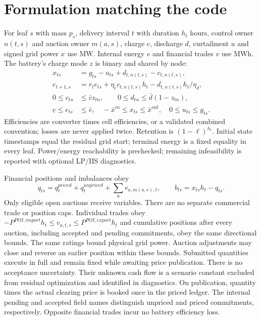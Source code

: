\documentclass[11pt,a4paper]{article}
\begin{document}
\section{Formulation matching the code}
For leaf $s$ with mass $p_s$, delivery interval $t$ with duration $h_t$ hours,
control owner $n(t,s)$ and auction owner $m(a,s)$, charge $c$, discharge $d$,
curtailment $u$ and signed grid power $x$ use MW. Internal energy $e$ and financial
trades $v$ use MWh. The battery's charge mode $z$ is binary and shared by node:
\begin{align}
x_{ts}&=g_{ts}-u_{ts}+d_{t,n(t,s)}-c_{t,n(t,s)},\\
e_{t+1,s}&=r_t e_{ts}+\eta_c c_{t,n(t,s)}h_t-d_{t,n(t,s)}h_t/\eta_d,\\
0\le c_{tn}&\le\bar c z_{tn},\qquad 0\le d_{tn}\le\bar d(1-z_{tn}),\\
\underline e\le e_{ts}&\le\bar e,\quad -\bar x^{in}\le x_{ts}\le\bar x^{out},\quad 0\le u_{ts}\le g_{ts}.
\end{align}
Efficiencies are converter times cell efficiencies, or a validated combined
convention; losses are never applied twice. Retention is $(1-\ell)^{h_t}$.
Initial state timestamps equal the residual grid start; terminal energy is a
fixed equality in every leaf. Power/energy reachability is prechecked; remaining
infeasibility is reported with optional LP/IIS diagnostics.

Financial positions and imbalances obey
\begin{equation}
q_{ts}=q^{priced}_t+q^{unpriced}_t+\sum_a v_{a,m(a,s),t},\qquad
b_{ts}=x_{ts}h_t-q_{ts}.
\end{equation}
Only eligible open auctions receive variables. There are no separate commercial
trade or position caps. Individual trades obey
$-P^{POI,import}h_t\le v_{a,t,s}\le P^{POI,export}h_t$ and cumulative positions
after every auction, including accepted and pending commitments, obey the same
directional bounds. The same ratings bound physical grid power. Auction
adjustments may close and reverse an earlier position within these bounds. Submitted quantities execute in full and remain
fixed while awaiting price publication. There is no acceptance uncertainty.
Their unknown cash flow is a scenario constant excluded from residual optimization
and identified in diagnostics. On publication, quantity times the actual clearing
price is booked once in the priced ledger. The internal pending and accepted field
names distinguish unpriced and priced commitments, respectively. Opposite financial trades incur no battery
efficiency loss.
\end{document}
